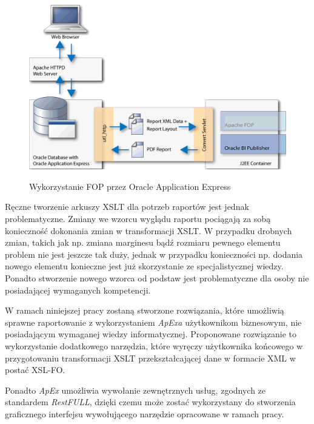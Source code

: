 \documentclass[11pt,a4paper]{article}
\begin{document}
\begin{figure}[h]
\centering
\caption{Wykorzystanie FOP przez Oracle Application Express}
\includegraphics[scale=0.5]{apex_fop_usage}
\label{img:apex_fop}
\end{figure}

Ręczne tworzenie arkuszy XSLT dla potrzeb raportów jest jednak problematyczne. Zmiany we wzorcu wyglądu raportu pociągają za sobą konieczność dokonania zmian w transformacji XSLT. W przypadku drobnych zmian, takich jak np. zmiana marginesu bądź rozmiaru pewnego elementu problem nie jest jeszcze tak duży, jednak w przypadku konieczności np. dodania nowego elementu konieczne jest już skorzystanie ze specjalistycznej wiedzy. Ponadto stworzenie nowego wzorca od podstaw jest problematyczne dla osoby nie posiadającej wymaganych kompetencji.

W ramach niniejszej pracy zostaną stworzone rozwiązania, które umożliwią sprawne raportowanie z wykorzystaniem \emph{ApExa} użytkownikom biznesowym, nie posiadającym wymaganej wiedzy informatycznej. Proponowane rozwiązanie to wykorzystanie dodatkowego narzędzia, które wyręczy użytkownika końcowego w przygotowaniu transformacji XSLT przekształcającej dane w formacie XML w postać XSL-FO.

Ponadto \emph{ApEx} umożliwia wywołanie zewnętrznych usług, zgodnych ze standardem \emph{RestFULL}, dzięki czemu może zostać wykorzystany do stworzenia graficznego interfejsu wywołującego narzędzie opracowane w ramach pracy.
\end{document}
